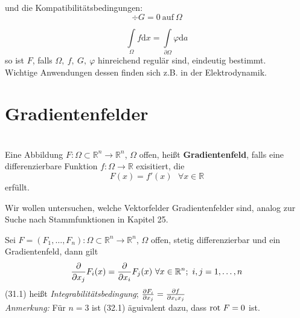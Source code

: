 und die Kompatibilitätsbedingungen: 
\begin{equation*}
\div G = 0 \ \mathrm{auf\ }\Omega
\end{equation*} 

\begin{equation*}
\int\limits_{\Omega} f \mathrm{d}x 
= 
\int\limits_{\partial \Omega} \varphi \mathrm{d}a
\end{equation*}
so ist $F $, falls $\Omega,\ f, \ G, \ \varphi $ hinreichend regulär sind, eindeutig bestimmt. \\
Wichtige Anwendungen dessen finden sich z.B. in der Elektrodynamik.


\section{Gradientenfelder}

\begin{definition}[Gradientenfeld]
\mbox{}\\
Eine Abbildung $F: \Omega \subset \mathbb{R}^n \rightarrow \mathbb{R}^n $,
$\Omega $ offen, heißt \textbf{Gradientenfeld},
falls eine differenzierbare Funktion $f: \Omega \rightarrow \mathbb{R} $ exisitiert,
die 
\begin{equation*}
F(x) = f'(x) \ \ \ \forall x \in \mathbb{R} 
\end{equation*}
erfüllt.
\end{definition}
Wir wollen untersuchen, welche Vektorfelder Gradientenfelder sind, analog zur Suche
nach Stammfunktionen in Kapitel 25.

\begin{satz}

Sei $F = (F_1, \ldots, F_n): \Omega \subset \mathbb{R}^n \rightarrow \mathbb{R}^n$,
$\Omega $ offen, stetig differenzierbar und ein Gradientenfeld, 
dann gilt
\begin{equation} 
    \pdiff{}{x_j} F_i (x) = \pdiff{}{x_i} F_j (x) \ \forall x \in \mathbb{R}^n; \
    i,j = 1, \ldots, n
\end{equation}
(31.1) heißt \emph{Integrabilitätsbedingung}; $\frac{\partial{F_i}}{\partial{x_j}} = \frac{\partial{f}}{\partial{x_i x_j}} $\\
\linebreak
\emph{Anmerkung:} Für $n=3 $ ist (32.1) äguivalent dazu, dass $\mathrm{rot\ } F = 0 $ ist.
\end{satz}

